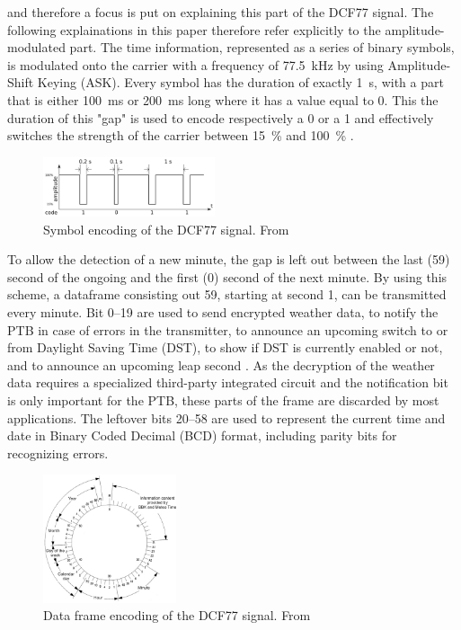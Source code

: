 \documentclass[conference]{IEEEtran}
\begin{document}
and therefore a focus is put on explaining this part of the DCF77 signal. The following explainations in this paper therefore refer explicitly to the amplitude-modulated part.
The time information, represented as a series of binary symbols, is modulated onto the carrier with a frequency of \SI{77.5}{\kilo\hertz} by using
Amplitude-Shift Keying (ASK). Every symbol has the duration of exactly \SI{1}{\second}, with a part that is either \SI{100}{\milli\second} or \SI{200}{\milli\second}
long where it has a value equal to 0.
This the duration of this "gap" is used to encode respectively a 0 or a 1 and effectively switches the strength of the carrier between \SI{15}{\percent} and \SI{100}{\percent} \cite{b5}.
\begin{figure}[htbp]
    \centerline{\includegraphics[width=0.45\textwidth]{img/dcf77_symbol_encoding.png}}
    \caption{Symbol encoding of the DCF77 signal. From \cite{b1}}
    \label{fig:dcf77_symbol_encoding}
\end{figure}
\FloatBarrier\noindent
To allow the detection of a new minute, the gap is left out between the last (59) second of the ongoing and the first (0) second of the next minute.
By using this scheme, a dataframe consisting out \SI{59}{\Bit}, starting at second 1, can be transmitted every minute.
Bit \SIrange{0}{19}{} are used to send encrypted weather data, to notify the PTB in case of errors in the transmitter, to announce an upcoming
switch to or from Daylight Saving Time (DST), to show if DST is currently enabled or not, and to announce an upcoming leap second \cite{b5}.
As the decryption of the weather data requires a specialized third-party integrated circuit and the notification bit is only important for the PTB, these parts
of the frame are discarded by most applications.
The leftover bits \SIrange{20}{58}{} are used to represent the current time and date in Binary Coded Decimal (BCD) format, including parity bits for recognizing errors.
\begin{figure}[htbp]
    \centerline{\includegraphics[width=0.35\textwidth]{img/dcf77_frame_encoding.jpg}}
    \caption{Data frame encoding of the DCF77 signal. From \cite{b5}}
    \label{fig:dcf77_data_encoding}
\end{figure}
\end{document}
